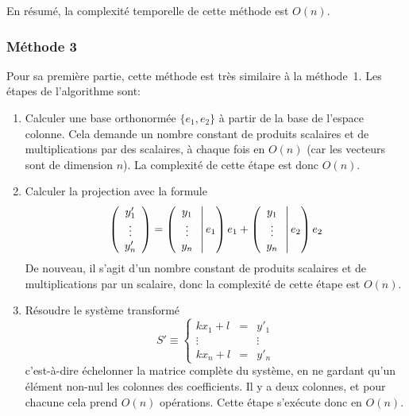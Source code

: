 En résumé, la complexité temporelle de cette méthode est $O(n)$.

\subsubsection*{Méthode 3}

Pour sa première partie, cette méthode est très similaire à la méthode~1.
Les étapes de l'algorithme sont:
\begin{enumerate}
    \item Calculer une base orthonormée $\{e_1,e_2\}$ à partir de la base
        de l'espace colonne. Cela demande un nombre constant de produits
        scalaires et de multiplications par des scalaires,
        à chaque fois en $O(n)$ (car les vecteurs sont de dimension $n$).
        La complexité de cette étape est donc $O(n)$.
    \item Calculer la projection avec la formule
        \begin{equation}
            \left(\begin{array}{c}y'_1\\\vdots\\y'_n\end{array}\right)
            =\left(\begin{array}{c}y_1\\\vdots\\y_n\end{array}\,\middle|\,e_1\right)e_1
            +\left(\begin{array}{c}y_1\\\vdots\\y_n\end{array}\,\middle|\,e_2\right)e_2
        \end{equation}
        De nouveau, il s'agit d'un nombre constant de produits scalaires
        et de multiplications par un scalaire, donc la complexité
        de cette étape est $O(n)$.
    \item Résoudre le système transformé
        \begin{equation}
            S' \equiv
            \left\{
                \begin{array}{ccc}
                    kx_1+l &=& y'_1\\
                    \vdots && \vdots\\
                    kx_n+l &=& y'_n
                \end{array}
            \right.
        \end{equation}
        c'est-à-dire échelonner la matrice complète du système,
        en ne gardant qu'un élément non-nul les colonnes des coefficients.
        Il y a deux colonnes, et pour chacune cela prend
        $O(n)$ opérations.
        Cette étape s'exécute donc en $O(n)$.
\end{enumerate}

